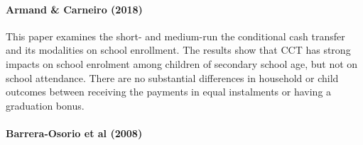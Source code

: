 \documentclass[a4paper, 10pt]{article}
\begin{document}

\paragraph{Armand \& Carneiro (2018)}

This paper examines the short- and medium-run the conditional cash transfer and its modalities on school enrollment. The results show that CCT has strong impacts on school enrolment among children of secondary school age, but not on school attendance. There are no substantial differences in household or child outcomes between receiving the payments in equal instalments or having a graduation bonus.

\paragraph{Barrera-Osorio et al (2008)}
\end{document}
